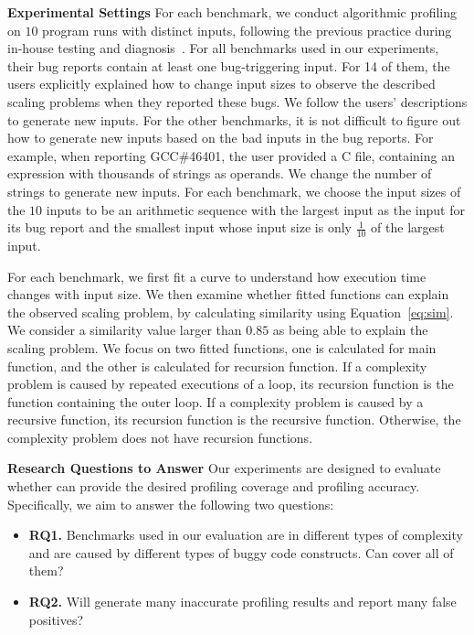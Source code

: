

\textbf{Experimental Settings}
For each benchmark, 
we conduct algorithmic profiling on $10$ program runs with distinct inputs, 
following the previous practice during in-house 
testing and diagnosis~\cite{SongOOPSLA2014,joy.asplos13}.
For all benchmarks used in our experiments,
their bug reports contain at least one bug-triggering input. 
For 14 of them, 
the users explicitly explained how to change input sizes to 
observe the described scaling problems when they reported these bugs. 
We follow the users' 
descriptions to generate new inputs.
For the other benchmarks, 
it is not difficult to figure out how to generate new inputs based 
on the bad inputs in the bug reports. 
For example, when reporting GCC\#46401, 
the user provided a C file, 
containing an expression with thousands of strings as operands. 
We change the number of strings to generate new inputs.
For each benchmark, we choose the input sizes of the $10$ inputs to be 
an arithmetic sequence with the largest input as the input for its bug report 
and the smallest input whose input size is 
only $\frac{1}{10}$ of the largest input.

For each benchmark, we first fit a curve to understand how execution 
time changes with input size. 
We then examine whether fitted functions can explain the observed scaling problem, 
by calculating similarity using Equation~\ref{eq:sim}. 
We consider a similarity value larger than $0.85$ as being able to explain the scaling problem. 
We focus on two fitted functions, one is calculated for main function, 
and the other is calculated for recursion function. 
If a complexity problem is caused by repeated executions of a loop,
its recursion function is the function containing the outer loop.
If a complexity problem is caused by a recursive function, 
its recursion function is the recursive function. 
Otherwise, the complexity problem does not have recursion functions. 


\textbf{Research Questions to Answer}
Our experiments are designed to evaluate whether \Tool can provide the desired profiling coverage 
and profiling accuracy. 
Specifically, we aim to answer the following two questions:

\begin{itemize}

\item {\bf RQ1.} 
Benchmarks used in our evaluation are in different types of complexity and 
are caused by different types of buggy code constructs. 
Can \Tool cover all of them? 
 
\item {\bf RQ2.}
Will \Tool generate many inaccurate profiling results and report many false positives? 

\end{itemize}

